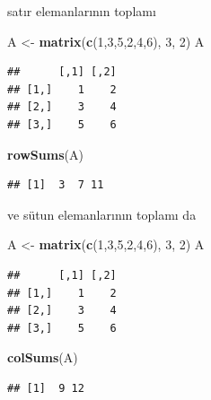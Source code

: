 \documentclass[
]{book}
\newenvironment{Shaded}{\begin{snugshade}}{\end{snugshade}}
\newcommand{\DecValTok}[1]{\textcolor[rgb]{0.00,0.00,0.81}{#1}}
\newcommand{\FunctionTok}[1]{\textcolor[rgb]{0.13,0.29,0.53}{\textbf{#1}}}
\newcommand{\NormalTok}[1]{#1}
\newcommand{\OtherTok}[1]{\textcolor[rgb]{0.56,0.35,0.01}{#1}}
\begin{document}
satır elemanlarının toplamı

\begin{Shaded}
\begin{Highlighting}[]
\NormalTok{ A }\OtherTok{\textless{}{-}} \FunctionTok{matrix}\NormalTok{(}\FunctionTok{c}\NormalTok{(}\DecValTok{1}\NormalTok{,}\DecValTok{3}\NormalTok{,}\DecValTok{5}\NormalTok{,}\DecValTok{2}\NormalTok{,}\DecValTok{4}\NormalTok{,}\DecValTok{6}\NormalTok{), }\DecValTok{3}\NormalTok{, }\DecValTok{2}\NormalTok{) }
\NormalTok{ A }
\end{Highlighting}
\end{Shaded}

\begin{verbatim}
##      [,1] [,2]
## [1,]    1    2
## [2,]    3    4
## [3,]    5    6
\end{verbatim}

\begin{Shaded}
\begin{Highlighting}[]
 \FunctionTok{rowSums}\NormalTok{(A)}
\end{Highlighting}
\end{Shaded}

\begin{verbatim}
## [1]  3  7 11
\end{verbatim}

ve sütun elemanlarının toplamı da

\begin{Shaded}
\begin{Highlighting}[]
\NormalTok{ A }\OtherTok{\textless{}{-}} \FunctionTok{matrix}\NormalTok{(}\FunctionTok{c}\NormalTok{(}\DecValTok{1}\NormalTok{,}\DecValTok{3}\NormalTok{,}\DecValTok{5}\NormalTok{,}\DecValTok{2}\NormalTok{,}\DecValTok{4}\NormalTok{,}\DecValTok{6}\NormalTok{), }\DecValTok{3}\NormalTok{, }\DecValTok{2}\NormalTok{) }
\NormalTok{ A }
\end{Highlighting}
\end{Shaded}

\begin{verbatim}
##      [,1] [,2]
## [1,]    1    2
## [2,]    3    4
## [3,]    5    6
\end{verbatim}

\begin{Shaded}
\begin{Highlighting}[]
 \FunctionTok{colSums}\NormalTok{(A) }
\end{Highlighting}
\end{Shaded}

\begin{verbatim}
## [1]  9 12
\end{verbatim}
\end{document}
